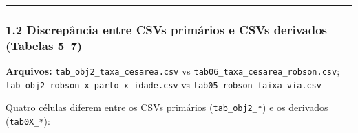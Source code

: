 \documentclass[
]{article}
\begin{document}
\begin{center}\rule{0.5\linewidth}{0.5pt}\end{center}

\hypertarget{discrepuxe2ncia-entre-csvs-primuxe1rios-e-csvs-derivados-tabelas-57}{%
\subsubsection{1.2 Discrepância entre CSVs primários e CSVs derivados
(Tabelas
5--7)}\label{discrepuxe2ncia-entre-csvs-primuxe1rios-e-csvs-derivados-tabelas-57}}

\textbf{Arquivos:} \texttt{tab\_obj2\_taxa\_cesarea.csv} vs
\texttt{tab06\_taxa\_cesarea\_robson.csv};
\texttt{tab\_obj2\_robson\_x\_parto\_x\_idade.csv} vs
\texttt{tab05\_robson\_faixa\_via.csv}

Quatro células diferem entre os CSVs primários (\texttt{tab\_obj2\_*}) e
os derivados (\texttt{tab0X\_*}):
\end{document}
